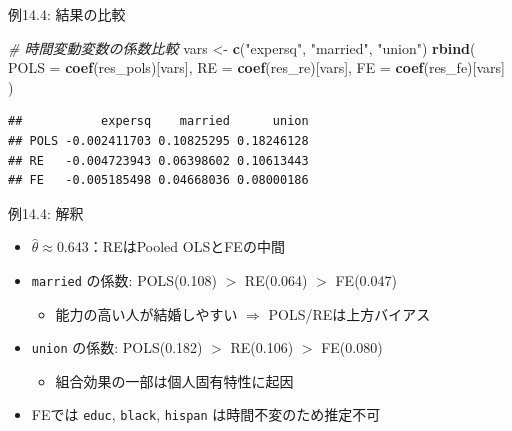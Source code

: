 \documentclass[
  ignorenonframetext,
]{beamer}
\newenvironment{Shaded}{\begin{snugshade}}{\end{snugshade}}
\newcommand{\AttributeTok}[1]{\textcolor[rgb]{0.13,0.29,0.53}{#1}}
\newcommand{\CommentTok}[1]{\textcolor[rgb]{0.56,0.35,0.01}{\textit{#1}}}
\newcommand{\FunctionTok}[1]{\textcolor[rgb]{0.13,0.29,0.53}{\textbf{#1}}}
\newcommand{\NormalTok}[1]{#1}
\newcommand{\OtherTok}[1]{\textcolor[rgb]{0.56,0.35,0.01}{#1}}
\newcommand{\StringTok}[1]{\textcolor[rgb]{0.31,0.60,0.02}{#1}}
\providecommand{\tightlist}{%
  \setlength{\itemsep}{0pt}\setlength{\parskip}{0pt}}
\begin{document}
\begin{frame}[fragile]{例14.4: 結果の比較}
\label{ux4f8b14.4-ux7d50ux679cux306eux6bd4ux8f03}
\footnotesize

\begin{Shaded}
\begin{Highlighting}[]
\CommentTok{\# 時間変動変数の係数比較}
\NormalTok{vars }\OtherTok{\textless{}{-}} \FunctionTok{c}\NormalTok{(}\StringTok{"expersq"}\NormalTok{, }\StringTok{"married"}\NormalTok{, }\StringTok{"union"}\NormalTok{)}
\FunctionTok{rbind}\NormalTok{(}
  \AttributeTok{POLS =} \FunctionTok{coef}\NormalTok{(res\_pols)[vars],}
  \AttributeTok{RE   =} \FunctionTok{coef}\NormalTok{(res\_re)[vars],}
  \AttributeTok{FE   =} \FunctionTok{coef}\NormalTok{(res\_fe)[vars]}
\NormalTok{)}
\end{Highlighting}
\end{Shaded}

\begin{verbatim}
##           expersq    married      union
## POLS -0.002411703 0.10825295 0.18246128
## RE   -0.004723943 0.06398602 0.10613443
## FE   -0.005185498 0.04668036 0.08000186
\end{verbatim}

\normalsize
\end{frame}

\begin{frame}[fragile]{例14.4: 解釈}
\label{ux4f8b14.4-ux89e3ux91c8}
\begin{itemize}
\tightlist
\item
  \(\hat{\theta} \approx 0.643\)：REはPooled OLSとFEの中間
\item
  \texttt{married} の係数: POLS(0.108) \(>\) RE(0.064) \(>\) FE(0.047)

  \begin{itemize}
  \tightlist
  \item
    能力の高い人が結婚しやすい \(\Rightarrow\) POLS/REは上方バイアス
  \end{itemize}
\item
  \texttt{union} の係数: POLS(0.182) \(>\) RE(0.106) \(>\) FE(0.080)

  \begin{itemize}
  \tightlist
  \item
    組合効果の一部は個人固有特性に起因
  \end{itemize}
\item
  FEでは \texttt{educ}, \texttt{black}, \texttt{hispan}
  は時間不変のため推定不可
\end{itemize}
\end{frame}
\end{document}
